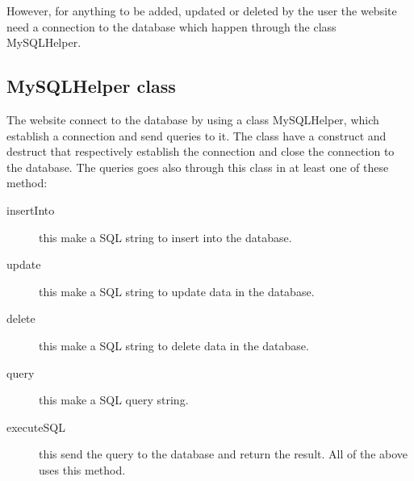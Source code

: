 However, for anything to be added, updated or deleted by the user the website need a connection to the database which happen through the class MySQLHelper. 

\subsection{MySQLHelper class}
The website connect to the database by using a class MySQLHelper, which establish a connection and send queries to it. The class have a construct and destruct that respectively establish the connection and close the connection to the database. The queries goes also through this class in at least one of these method:

\begin{description}
	\item[insertInto] this make a SQL string to insert into the database.
	\item[update] this make a SQL string to update data in the database.	
	\item[delete] this make a SQL string to delete data in the database.
	\item[query] this make a SQL query string.
	\item[executeSQL] this send the query to the database and return the result. All of the above uses this method.
\end{description}
  




